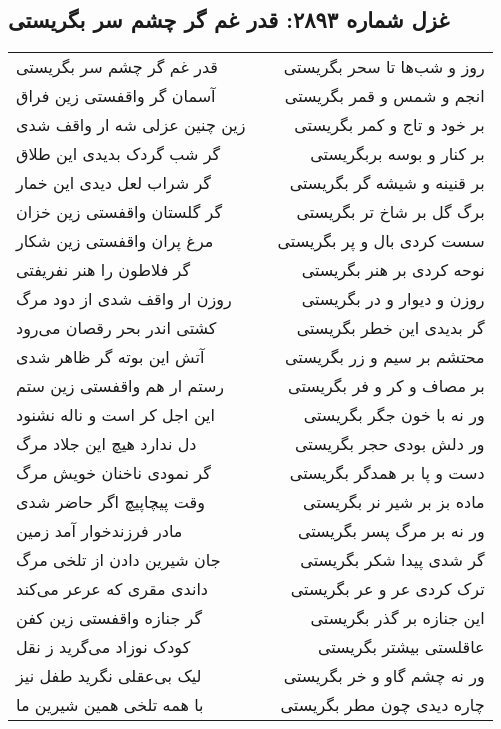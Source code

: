 \begin{center}
\section*{غزل شماره ۲۸۹۳: قدر غم گر چشم سر بگریستی}
\label{sec:2893}
\begin{longtable}{l p{0.5cm} r}
قدر غم گر چشم سر بگریستی
&&
روز و شب‌ها تا سحر بگریستی
\\
آسمان گر واقفستی زین فراق
&&
انجم و شمس و قمر بگریستی
\\
زین چنین عزلی شه ار واقف شدی
&&
بر خود و تاج و کمر بگریستی
\\
گر شب گردک بدیدی این طلاق
&&
بر کنار و بوسه بربگریستی
\\
گر شراب لعل دیدی این خمار
&&
بر قنینه و شیشه گر بگریستی
\\
گر گلستان واقفستی زین خزان
&&
برگ گل بر شاخ تر بگریستی
\\
مرغ پران واقفستی زین شکار
&&
سست کردی بال و پر بگریستی
\\
گر فلاطون را هنر نفریفتی
&&
نوحه کردی بر هنر بگریستی
\\
روزن ار واقف شدی از دود مرگ
&&
روزن و دیوار و در بگریستی
\\
کشتی اندر بحر رقصان می‌رود
&&
گر بدیدی این خطر بگریستی
\\
آتش این بوته گر ظاهر شدی
&&
محتشم بر سیم و زر بگریستی
\\
رستم ار هم واقفستی زین ستم
&&
بر مصاف و کر و فر بگریستی
\\
این اجل کر است و ناله نشنود
&&
ور نه با خون جگر بگریستی
\\
دل ندارد هیچ این جلاد مرگ
&&
ور دلش بودی حجر بگریستی
\\
گر نمودی ناخنان خویش مرگ
&&
دست و پا بر همدگر بگریستی
\\
وقت پیچاپیچ اگر حاضر شدی
&&
ماده بز بر شیر نر بگریستی
\\
مادر فرزندخوار آمد زمین
&&
ور نه بر مرگ پسر بگریستی
\\
جان شیرین دادن از تلخی مرگ
&&
گر شدی پیدا شکر بگریستی
\\
داندی مقری که عرعر می‌کند
&&
ترک کردی عر و عر بگریستی
\\
گر جنازه واقفستی زین کفن
&&
این جنازه بر گذر بگریستی
\\
کودک نوزاد می‌گرید ز نقل
&&
عاقلستی بیشتر بگریستی
\\
لیک بی‌عقلی نگرید طفل نیز
&&
ور نه چشم گاو و خر بگریستی
\\
با همه تلخی همین شیرین ما
&&
چاره دیدی چون مطر بگریستی

\end{longtable}
\end{center}
